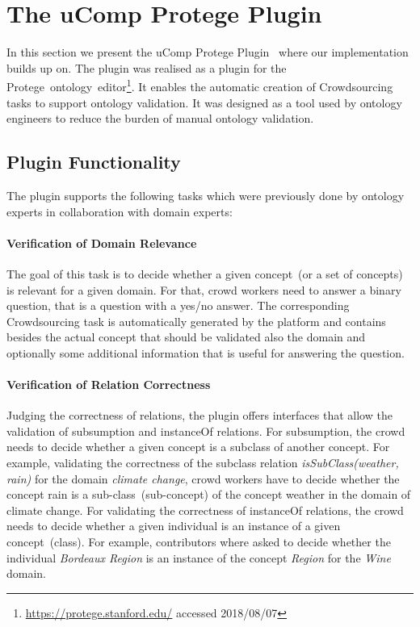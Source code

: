 
\section{The uComp Protege Plugin}\label{sec:ucomp_protege_plugin}
In this section we present the uComp Protege Plugin~\cite{wohlgenannt2016} where our implementation builds up on. The plugin was realised as a plugin for the Protege~ontology~editor\footnote{\url{https://protege.stanford.edu/} accessed 2018/08/07}. It enables the automatic creation of Crowdsourcing tasks to support ontology validation. It was designed as a tool used by ontology engineers to reduce the burden of manual ontology validation.

\subsection{Plugin Functionality}\label{sec:ucomp_protege_plugin_functionality}
The plugin supports the following tasks which were previously done by ontology experts in collaboration with domain experts:

\paragraph{Verification of Domain Relevance}
The goal of this task is to decide whether a given concept~(or a set of concepts) is relevant for a given domain. For that, crowd workers need to
answer a binary question, that is a question with a yes/no answer. The corresponding Crowdsourcing task is automatically generated by the platform and
contains besides the actual concept that should be validated also the domain and optionally some additional information that is useful for answering 
the question. 

\paragraph{Verification of Relation Correctness}
Judging the correctness of relations, the plugin offers interfaces that allow the validation of subsumption and instanceOf relations. 
For subsumption, the crowd needs to decide whether a given concept is a subclass of another concept. For example, validating the correctness
of the subclass relation \emph{isSubClass(weather, rain)} for the domain \emph{climate change}, crowd workers have to decide whether the concept rain is a sub-class~(sub-concept) of the concept weather in the domain of climate change. For validating the correctness of instanceOf relations, the crowd needs to decide whether a given individual is an instance of a given concept~(class). For example, contributors where asked to decide whether the individual \emph{Bordeaux Region} is an instance of the concept \emph{Region} for the \emph{Wine} domain. 


